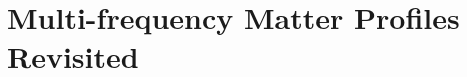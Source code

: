 





\section{\label{chap:matter-subsec:multi-frequency-revisited}Multi-frequency Matter Profiles Revisited}


